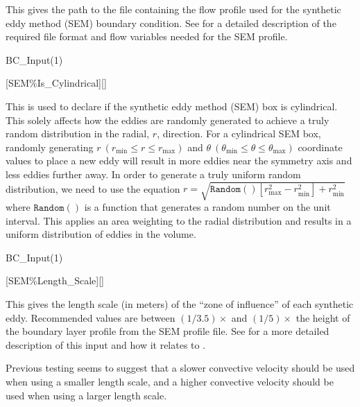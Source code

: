 \begin{nmldescbody}
This gives the path to the file containing the flow profile used for the
synthetic eddy method (SEM) boundary condition.
%
See  for a detailed description of the
required file format and flow variables needed for the SEM profile.
\end{nmldescbody}


\begin{nmldescitem}
BC_Input(1)%
\end{nmldescitem}
[SEM\%Is\_Cylindrical][]

\begin{nmldescbody}
This is used to declare if the synthetic eddy method (SEM) box is cylindrical.
%
This solely affects how the eddies are randomly generated to achieve a
truly random distribution in the radial, $r$, direction.
%
For a cylindrical SEM box, randomly generating
  $r\ (r_{\textrm{min}}\le r \le r_{\textrm{max}})$ and
  $\theta\ (\theta_{\textrm{min}}\le \theta \le \theta_{\textrm{max}})$
coordinate values to place a new eddy will result in
more eddies near the symmetry axis and
less eddies further away.
%
In order to generate a truly uniform random distribution,
we need to use the equation
  $r=\sqrt{\mathtt{Random}()\left[ r^2_{\textrm{max}}
                                 - r^2_{\textrm{min}}
                            \right] + r^2_{\textrm{min}}}$
where $\mathtt{Random}()$ is a function that generates a random number
on the unit interval.
%
This applies an area weighting to the radial distribution and
results in a uniform distribution of eddies in the volume.

\end{nmldescbody}


\begin{nmldescitem}
BC_Input(1)%
\end{nmldescitem}
[SEM\%Length\_Scale][]

\begin{nmldescbody}
This gives the length scale (in meters) of the ``zone of influence'' of each
synthetic eddy.
%
Recommended values are between $(1/3.5)\times$ and $(1/5)\times$ the
height of the boundary layer profile from the SEM profile file.
%
See 
for a more detailed description of this input and how it relates to
.

\NOTE
Previous testing seems to suggest that a slower convective velocity
should be used when using a smaller length scale, and a higher convective
velocity should be used when using a larger length scale.
\end{nmldescbody}

